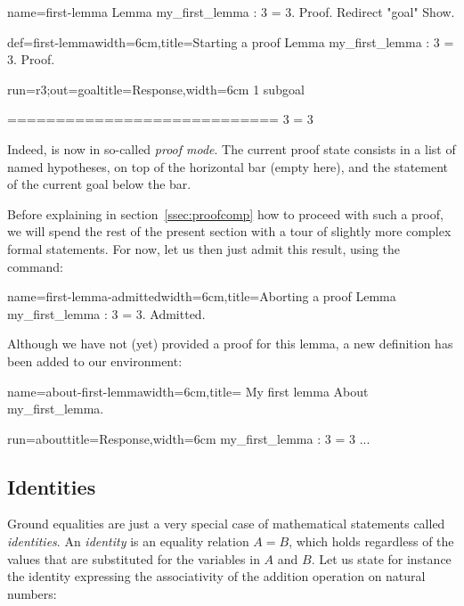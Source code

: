 \begin{coqdef}{name=first-lemma}
Lemma my_first_lemma : 3 = 3.
Proof. Redirect "goal" Show.
\end{coqdef}
\begin{coq}{def=first-lemma}{width=6cm,title=Starting a proof}
Lemma my_first_lemma : 3 = 3.
Proof.
\end{coq}
\begin{coqout}{run=r3;out=goal}{title=Response,width=6cm}
1 subgoal

  ============================
   3 = 3
\end{coqout}
Indeed, \Coq{} is now in so-called \emph{proof mode}. The
current proof state consists in a list of named hypotheses, on top of
the horizontal bar (empty here), and the statement of the current goal
below the bar.

Before explaining in section~\ref{ssec:proofcomp} how to proceed with
such a proof, we will spend the rest of the present section with
a tour of slightly more complex formal statements.
For now, let us then just admit this result, using the 
command:

\begin{coq}{name=first-lemma-admitted}{width=6cm,title=Aborting a proof}
Lemma my_first_lemma : 3 = 3.
Admitted.
\end{coq}

Although we have not (yet) provided a proof for this lemma, a new
definition has been added to our environment:

\begin{coq}{name=about-first-lemma}{width=6cm,title= My first lemma}
About my_first_lemma.
\end{coq}
\begin{coqout}{run=about}{title=Response,width=6cm}
my_first_lemma : 3 = 3
...
\end{coqout}


\subsection{Identities}\label{ssec:id}


Ground equalities are just a very special case of mathematical
statements called \emph{identities}. An \emph{identity} is an equality
relation $A = B$, which holds regardless of the values that are
substituted for the variables in $A$ and $B$.
Let us state for instance the identity expressing the associativity of
the addition operation  on natural numbers:

